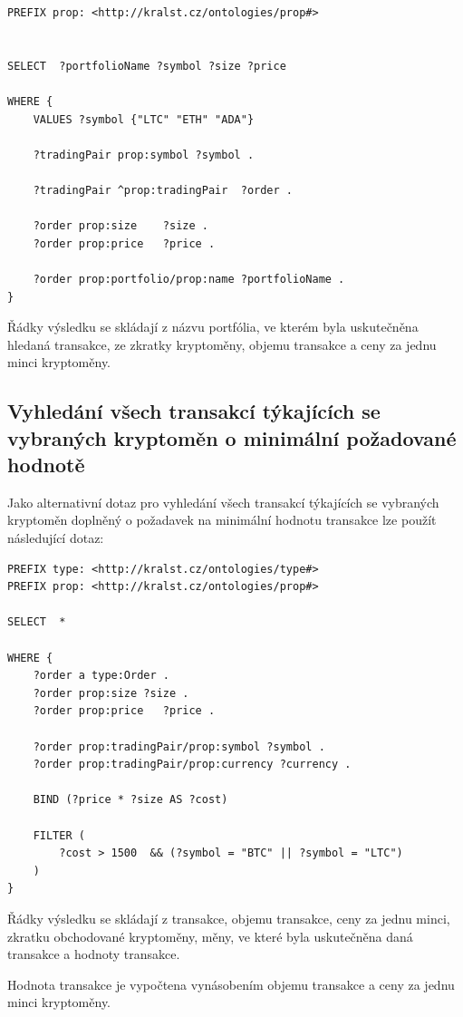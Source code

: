 \documentclass[12pt, a4paper]{article}
\begin{document}
\begin{lstlisting}
PREFIX prop: <http://kralst.cz/ontologies/prop#>


SELECT  ?portfolioName ?symbol ?size ?price

WHERE {
    VALUES ?symbol {"LTC" "ETH" "ADA"}

    ?tradingPair prop:symbol ?symbol .

    ?tradingPair ^prop:tradingPair	?order .

    ?order prop:size	?size .
    ?order prop:price	?price .

    ?order prop:portfolio/prop:name ?portfolioName .
}

\end{lstlisting}

Řádky výsledku se skládají z názvu portfólia, ve kterém byla uskutečněna hledaná transakce, ze zkratky kryptoměny, objemu transakce a ceny za jednu minci kryptoměny.


\subsection{Vyhledání všech transakcí týkajících se vybraných kryptoměn o minimální požadované hodnotě}
Jako alternativní dotaz pro vyhledání všech transakcí týkajících se vybraných kryptoměn doplněný o požadavek na minimální hodnotu transakce lze použít následující dotaz:

\begin{lstlisting}
PREFIX type: <http://kralst.cz/ontologies/type#>
PREFIX prop: <http://kralst.cz/ontologies/prop#>

SELECT  *

WHERE {
  	?order a type:Order .
  	?order prop:size ?size .
  	?order prop:price	?price .
  
  	?order prop:tradingPair/prop:symbol ?symbol .
  	?order prop:tradingPair/prop:currency ?currency .

	BIND (?price * ?size AS ?cost) 
    
  	FILTER (
    	?cost > 1500  && (?symbol = "BTC" || ?symbol = "LTC")
    )
}
\end{lstlisting}

Řádky výsledku se skládají z transakce, objemu transakce, ceny za jednu minci, zkratku obchodované kryptoměny, měny, ve které byla uskutečněna daná transakce a hodnoty transakce.

Hodnota transakce je vypočtena vynásobením objemu transakce a ceny za jednu minci kryptoměny.
\end{document}
